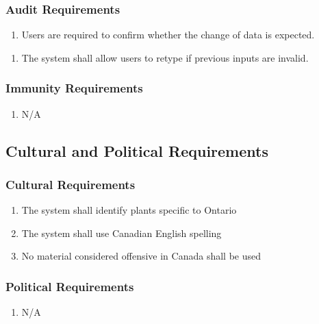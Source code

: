 \documentclass[]{article}
\begin{document}
\subsubsection{Audit Requirements}
\label{ssub:audit_requirements}
\begin{enumerate}[{SR}7.]
	\item Users are required to confirm whether the change of data is expected.
	\end{enumerate}
	\begin{enumerate}[{SR}8.]
	\item The system shall allow users to retype if previous inputs are invalid.
\end{enumerate}

\subsubsection{Immunity Requirements}
\label{ssub:immunity_requirements}
\begin{enumerate}[{SR}9.]
	\item{\color{red} N/A}
\end{enumerate}


\subsection{Cultural and Political Requirements}
\label{sub:cultural_and_political_requirements}

\subsubsection{Cultural Requirements}
\label{ssub:cultural_requirements}
\begin{enumerate}[{CP}1.]
	\item The {\color{red}system} shall identify plants specific to Ontario
	\item The {\color{red}system} shall use Canadian English spelling
	\item No material considered offensive in Canada shall be used
\end{enumerate}

\subsubsection{Political Requirements}
\label{ssub:political_requirements}
\begin{enumerate}[{CP}4.]
	\item {\color{red}N/A}
\end{enumerate}
\end{document}
